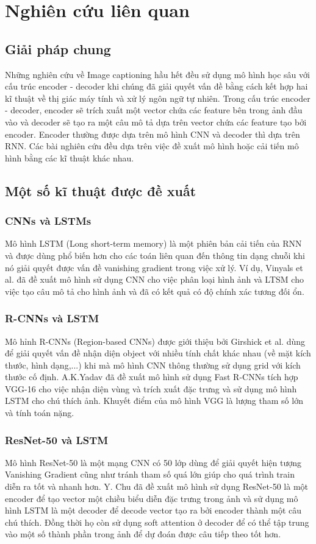 \documentclass[conference]{IEEEtran}
\begin{document}
\section{Nghiên cứu liên quan}
\subsection{Giải pháp chung}
Những nghiên cứu về Image captioning hầu hết đều sử dụng mô hình học sâu với cấu trúc encoder - decoder khi chúng đã giải quyết vấn đề bằng cách kết hợp hai kĩ thuật về thị giác máy tính và xử lý ngôn ngữ tự nhiên.
Trong cấu trúc encoder - decoder, encoder sẽ trích xuất một vector chứa các feature bên trong ảnh đầu vào và decoder sẽ tạo ra một câu mô tả dựa trên vector chứa các feature tạo bởi encoder.
Encoder thường được dựa trên mô hình CNN và decoder thì dựa trên RNN. Các bài nghiên cứu đều dựa trên việc đề xuất mô hình hoặc cải tiến mô hình bằng các kĩ thuật khác nhau. 

\subsection{Một số kĩ thuật được đề xuất}
\subsubsection{CNNs và LSTMs} 
Mô hình LSTM (Long short-term memory) \cite{hochreiter1997long} là một phiên bản cải tiến của RNN và được dùng phổ biến hơn cho các toán liên quan đến thông tin dạng chuỗi khi nó giải quyết được vấn đề vanishing gradient trong việc xử lý. Ví dụ, Vinyals et al. đã đề xuất mô hình sử dụng CNN cho việc phân loại hình ảnh và LTSM cho việc tạo câu mô tả cho hình ảnh \cite{vinyals2015show} và đã có kết quả có độ chính xác tương đối ổn.
\subsubsection{R-CNNs và LSTM}
Mô hỉnh R-CNNs (Region-based CNNs) được giới thiệu bởi Girshick et al. \cite{girshick2014rich} dùng để giải quyết vấn đề nhận diện object với nhiều tính chất khác nhau (về mặt kích thước, hình dạng,...) khi mà mô hình CNN thông thường sử dụng grid với kích thước cố định. A.K.Yadav đã đề xuất mô hình sử dụng Fast R-CNNs tích hợp VGG-16 cho việc nhận diện vùng và trích xuất đặc trưng và sử dụng mô hình LSTM cho chú thích ảnh. Khuyết điểm của mô hình VGG là lượng tham số lớn và tính toán nặng.  
\subsubsection{ResNet-50 và LSTM}
Mô hình ResNet-50 là một mạng CNN có 50 lớp dùng để giải quyết hiện tượng Vanishing Gradient cũng như tránh tham số quá lớn giúp cho quá trình train diễn ra tốt và nhanh hơn.  Y. Chu \cite{chu2020automatic} đã đề xuất mô hình sử dụng ResNet-50 là một encoder để tạo vector một chiều biểu diễn đặc trưng trong ảnh và sử dụng mô hình LSTM là một decoder để decode vector tạo ra bởi encoder thành một câu chú thích. Đồng thời họ còn sử dụng soft attention ở decoder để có thể tập trung vào một số thành phần trong ảnh để dự đoán được câu tiếp theo tốt hơn. 
\end{document}
